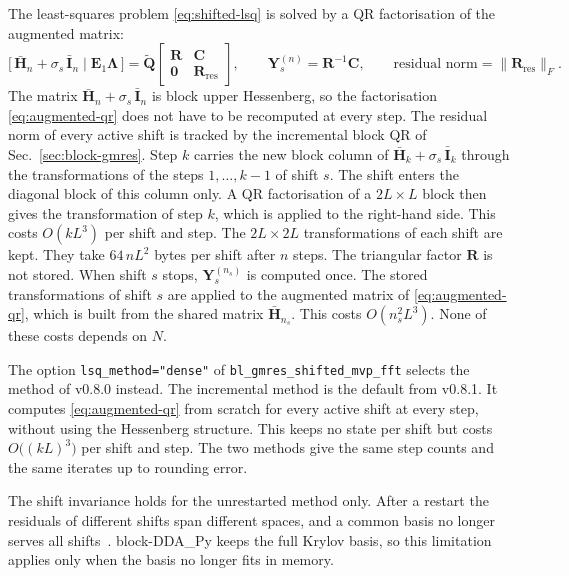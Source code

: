 \documentclass[11pt,a4paper]{article}
\begin{document}
The least-squares problem \eqref{eq:shifted-lsq} is solved by a QR
factorisation of the augmented matrix:
\begin{equation}
  \bigl[\, \bar{\mathbf{H}}_n + \sigma_s\,\bar{\mathbf{I}}_n \;\big|\;
         \mathbf{E}_1 \boldsymbol{\Lambda} \,\bigr]
  = \tilde{\mathbf{Q}}
    \begin{bmatrix}
      \mathbf{R} & \mathbf{C} \\
      \mathbf{0} & \mathbf{R}_{\text{res}}
    \end{bmatrix},
  \qquad
  \mathbf{Y}_s^{(n)} = \mathbf{R}^{-1} \mathbf{C},
  \qquad
  \text{residual norm} = \| \mathbf{R}_{\text{res}} \|_F .
  \label{eq:augmented-qr}
\end{equation}
The matrix $\bar{\mathbf{H}}_n + \sigma_s\,\bar{\mathbf{I}}_n$ is block
upper Hessenberg, so the factorisation \eqref{eq:augmented-qr} does not
have to be recomputed at every step.
The residual norm of every active shift is tracked by the incremental
block QR of Sec.~\ref{sec:block-gmres}.
Step $k$ carries the new block column of
$\bar{\mathbf{H}}_k + \sigma_s\,\bar{\mathbf{I}}_k$ through the
transformations of the steps $1, \ldots, k-1$ of shift $s$.
The shift enters the diagonal block of this column only.
A QR factorisation of a $2L \times L$ block then gives the
transformation of step $k$, which is applied to the right-hand side.
This costs $O(k L^3)$ per shift and step.
The $2L \times 2L$ transformations of each shift are kept.
They take $64\,n L^2$ bytes per shift after $n$ steps.
The triangular factor $\mathbf{R}$ is not stored.
When shift $s$ stops, $\mathbf{Y}_s^{(n_s)}$ is computed once.
The stored transformations of shift $s$ are applied to the augmented
matrix of \eqref{eq:augmented-qr}, which is built from the shared
matrix $\bar{\mathbf{H}}_{n_s}$.
This costs $O(n_s^2 L^3)$.
None of these costs depends on $N$.

The option \texttt{lsq\_method="dense"} of
\texttt{bl\_gmres\_shifted\_mvp\_fft} selects the method of v0.8.0
instead.
The incremental method is the default from v0.8.1.
It computes \eqref{eq:augmented-qr} from scratch for every active shift
at every step, without using the Hessenberg structure.
This keeps no state per shift but costs $O\bigl((kL)^3\bigr)$ per shift
and step.
The two methods give the same step counts and the same iterates up to
rounding error.

The shift invariance holds for the unrestarted method only.
After a restart the residuals of different shifts span different
spaces, and a common basis no longer serves all
shifts~\cite{FrommerGlassner1998}.
block-DDA\_Py keeps the full Krylov basis, so this limitation applies
only when the basis no longer fits in memory.
\end{document}
